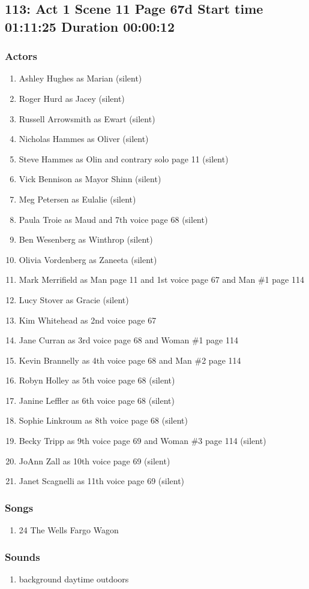 \subsection{113: Act 1 Scene 11 Page 67d Start time 01:11:25 Duration 00:00:12}

\subsubsection{Actors}
\begin{enumerate}
\item Ashley Hughes as Marian (silent)
\item Roger Hurd as Jacey (silent)
\item Russell Arrowsmith as Ewart (silent)
\item Nicholas Hammes as Oliver (silent)
\item Steve Hammes as Olin and contrary solo page 11 (silent)
\item Vick Bennison as Mayor Shinn (silent)
\item Meg Petersen as Eulalie (silent)
\item Paula Troie as Maud and 7th voice page 68 (silent)
\item Ben Wesenberg as Winthrop (silent)
\item Olivia Vordenberg as Zaneeta (silent)
\item Mark Merrifield as Man page 11 and 1st voice page 67 and Man \#1 page 114
\item Lucy Stover as Gracie (silent)
\item Kim Whitehead as 2nd voice page 67
\item Jane Curran as 3rd voice page 68 and Woman \#1 page 114
\item Kevin Brannelly as 4th voice page 68 and Man \#2 page 114
\item Robyn Holley as 5th voice page 68 (silent)
\item Janine Leffler as 6th voice page 68 (silent)
\item Sophie Linkroum as 8th voice page 68 (silent)
\item Becky Tripp as 9th voice page 69 and Woman \#3 page 114 (silent)
\item JoAnn Zall as 10th voice page 69 (silent)
\item Janet Scagnelli as 11th voice page 69 (silent)
\end{enumerate}

\subsubsection{Songs}
\begin{enumerate}
\item 24 The Wells Fargo Wagon
\end{enumerate}\subsubsection{Sounds}
\begin{enumerate}
\item background daytime outdoors
\end{enumerate}
